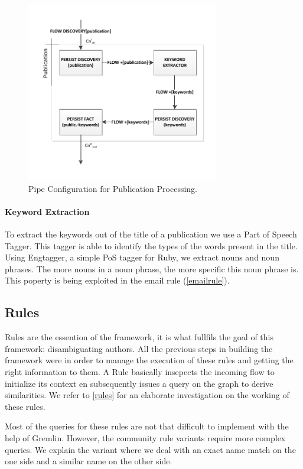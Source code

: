 \begin{figure}[htb]
	\centering
		\includegraphics[width=0.75\textwidth]{fig/publicationpipe}
	\caption{Pipe Configuration for Publication Processing.}
	\label{fig:publicationpipe}
\end{figure}

\paragraph{Keyword Extraction} To extract the keywords out of the title of a publication we use a Part of Speech Tagger. This tagger is able to identify the types of the words present in the title. Using Engtagger, a simple PoS tagger for Ruby, we extract nouns and noun phrases. The more nouns in a noun phrase, the more specific this noun phrase is. This poperty is being exploited in the email rule (\autoref{emailrule}).

\subsection{Rules}

Rules are the essention of the framework, it is what fullfils the goal of this framework: disambiguating authors. All the previous steps in building the framework were in order to manage the execution of these rules and getting the right information to them. A Rule basically insepects the incoming flow to initialize its context en subsequently issues a query on the graph to derive similarities. We refer to \autoref{rules} for an elaborate investigation on the working of these rules.

Most of the queries for these rules are not that difficult to implement with the help of Gremlin. However, the community rule variants require more complex queries. We explain the variant where we deal with an exact name match on the one side and a similar name on the other side. 

